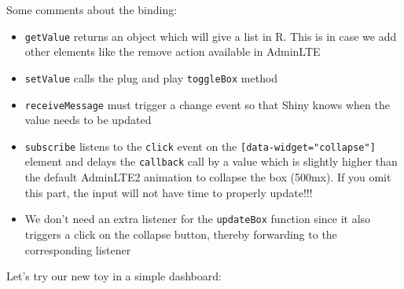 \documentclass[]{book}
\newenvironment{Shaded}{\begin{snugshade}}{\end{snugshade}}
\newcommand{\AttributeTok}[1]{\textcolor[rgb]{0.77,0.63,0.00}{#1}}
\newcommand{\DataTypeTok}[1]{\textcolor[rgb]{0.13,0.29,0.53}{#1}}
\newcommand{\DecValTok}[1]{\textcolor[rgb]{0.00,0.00,0.81}{#1}}
\newcommand{\KeywordTok}[1]{\textcolor[rgb]{0.13,0.29,0.53}{\textbf{#1}}}
\newcommand{\NormalTok}[1]{#1}
\newcommand{\OperatorTok}[1]{\textcolor[rgb]{0.81,0.36,0.00}{\textbf{#1}}}
\newcommand{\StringTok}[1]{\textcolor[rgb]{0.31,0.60,0.02}{#1}}
\newcommand{\VariableTok}[1]{\textcolor[rgb]{0.00,0.00,0.00}{#1}}
\providecommand{\tightlist}{%
  \setlength{\itemsep}{0pt}\setlength{\parskip}{0pt}}
\begin{document}
\begin{Shaded}
\end{Shaded}

Some comments about the binding:

\begin{itemize}
\tightlist
\item
  \texttt{getValue} returns an object which will give a list in R. This is in case we add other elements like the remove action available in AdminLTE
\item
  \texttt{setValue} calls the plug and play \texttt{toggleBox} method
\item
  \texttt{receiveMessage} must trigger a change event so that Shiny knows when the value needs to be updated
\item
  \texttt{subscribe} listens to the \texttt{click} event on the \texttt{{[}data-widget="collapse"{]}} element and delays the \texttt{callback} call by a value which is slightly higher than the default AdminLTE2 animation to collapse the box (500mx). If you omit this part, the input will not have time to properly update!!!
\item
  We don't need an extra listener for the \texttt{updateBox} function since it also triggers a click on the collapse button, thereby forwarding to the corresponding listener
\end{itemize}

Let's try our new toy in a simple dashboard:
\end{document}
